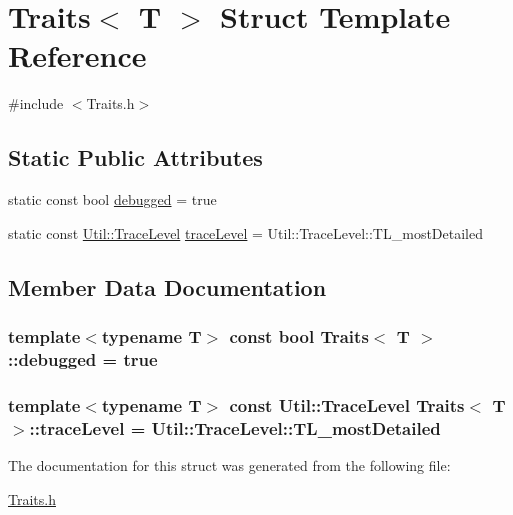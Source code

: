 \hypertarget{struct_traits}{\section{Traits$<$ T $>$ Struct Template Reference}
\label{struct_traits}
}


{\ttfamily \#include $<$Traits.\-h$>$}

\subsection*{Static Public Attributes}
\begin{DoxyCompactItemize}
\item 
static const bool \hyperlink{struct_traits_a0abb19a116800ab778598eed38bad4a0}{debugged} = true
\item 
static const \hyperlink{class_util_a604561d00f5999b5ca280401140e58d9}{Util\-::\-Trace\-Level} \hyperlink{struct_traits_a032499d15672915dd3349e6cc0e9c673}{trace\-Level} = Util\-::\-Trace\-Level\-::\-T\-L\-\_\-most\-Detailed
\end{DoxyCompactItemize}


\subsection{Member Data Documentation}
\hypertarget{struct_traits_a0abb19a116800ab778598eed38bad4a0}{
\subsubsection[{debugged}]{\setlength{\rightskip}{0pt plus 5cm}template$<$typename T$>$ const bool {\bf Traits}$<$ T $>$\-::debugged = true\hspace{0.3cm}{\ttfamily [static]}}}\label{struct_traits_a0abb19a116800ab778598eed38bad4a0}
\hypertarget{struct_traits_a032499d15672915dd3349e6cc0e9c673}{
\subsubsection[{trace\-Level}]{\setlength{\rightskip}{0pt plus 5cm}template$<$typename T$>$ const {\bf Util\-::\-Trace\-Level} {\bf Traits}$<$ T $>$\-::trace\-Level = Util\-::\-Trace\-Level\-::\-T\-L\-\_\-most\-Detailed\hspace{0.3cm}{\ttfamily [static]}}}\label{struct_traits_a032499d15672915dd3349e6cc0e9c673}


The documentation for this struct was generated from the following file\-:\begin{DoxyCompactItemize}
\item 
\hyperlink{_traits_8h}{Traits.\-h}\end{DoxyCompactItemize}
